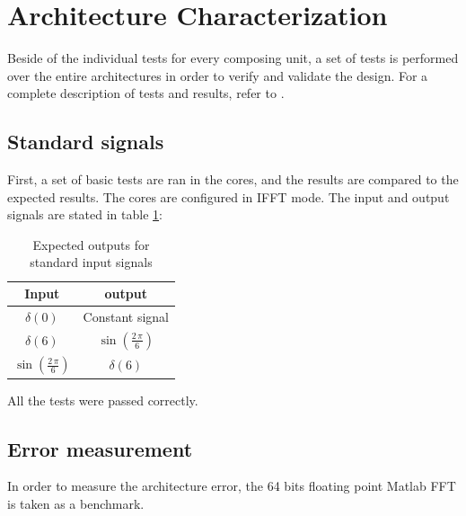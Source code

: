\documentclass[conference]{IEEEtran}
\begin{document}
\section{Architecture Characterization}

Beside of the individual tests for every composing unit, a set of tests is performed over the entire architectures in order to verify and validate the design.
For a complete description of tests and results, refer to \cite{tesis}.

\subsection{Standard signals}
First, a set of basic tests are ran in the cores, and the results are compared to the expected results. The cores are
configured in IFFT mode.
The input and output signals are stated in table \ref{table:iout}:

\begin{table}[htb!]
\caption{Expected outputs for standard input signals}
\begin{tabular}{c c}
\textbf{Input} & \textbf{output}\\
\hline 
$\delta(0)$ & Constant signal \\
$\delta(6)$ & $\sin(\frac{2 \, \pi}{6})$ \\
$\sin(\frac{2 \, \pi}{6})$ & $\delta(6)$\\
\hline
\end{tabular}
\label{table:iout}
\end{table}

All the tests were passed correctly.

\subsection{Error measurement}

In order to measure the architecture error, the 64 bits floating point Matlab FFT is taken as a benchmark.
\end{document}

